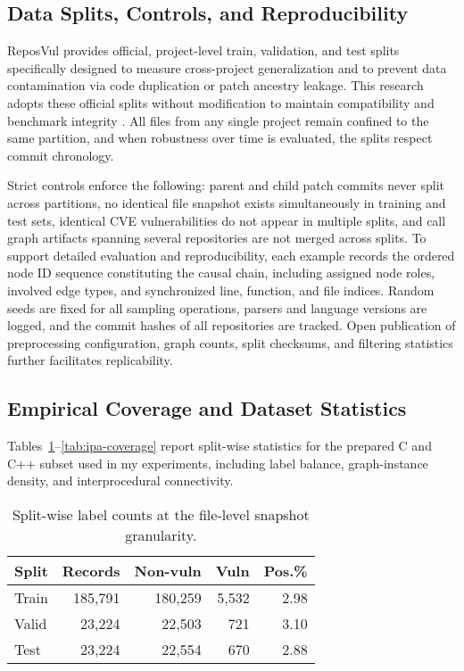 \documentclass{buthesis}
\begin{document}
\subsection{Data Splits, Controls, and Reproducibility}
\label{subsec:splits-leakage}

ReposVul provides official, project-level train, validation, and test splits specifically designed to measure cross-project generalization and to prevent data contamination via code duplication or patch ancestry leakage. This research adopts these official splits without modification to maintain compatibility and benchmark integrity \cite{wang2024reposvul}. All files from any single project remain confined to the same partition, and when robustness over time is evaluated, the splits respect commit chronology.

Strict controls enforce the following: parent and child patch commits never split across partitions, no identical file snapshot exists simultaneously in training and test sets, identical CVE vulnerabilities do not appear in multiple splits, and call graph artifacts spanning several repositories are not merged across splits. To support detailed evaluation and reproducibility, each example records the ordered node ID sequence constituting the causal chain, including assigned node roles, involved edge types, and synchronized line, function, and file indices. Random seeds are fixed for all sampling operations, parsers and language versions are logged, and the commit hashes of all repositories are tracked. Open publication of preprocessing configuration, graph counts, split checksums, and filtering statistics further facilitates replicability.

\subsection{Empirical Coverage and Dataset Statistics}
\label{subsec:ccpp-coverage}

Tables~\ref{tab:split-labels}–\ref{tab:ipa-coverage} report split-wise statistics for the prepared C and C++ subset used in my experiments, including label balance, graph-instance density, and interprocedural connectivity.

\begin{table}[H]
\centering
\caption{Split-wise label counts at the file-level snapshot granularity.}
\label{tab:split-labels}
\begin{tabular}{lrrrr}
\toprule
\textbf{Split} & \textbf{Records} & \textbf{Non-vuln} & \textbf{Vuln} & \textbf{Pos.\%} \\
\midrule
Train & 185{,}791 & 180{,}259 & 5{,}532 & 2.98 \\
Valid & 23{,}224 & 22{,}503 & 721 & 3.10 \\
Test  & 23{,}224 & 22{,}554 & 670 & 2.88 \\
\bottomrule
\end{tabular}
\end{table}
\end{document}
